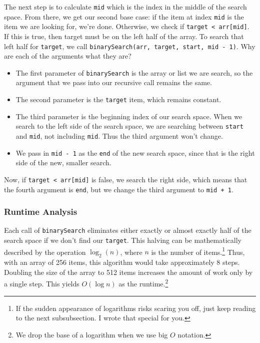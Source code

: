 The next step is to calculate \texttt{mid} which is the index in the middle of the search space.  From there, we get our second base case:  if the item at index \texttt{mid} is the item we are looking for, we're done.   Otherwise, we check if \texttt{target < arr[mid]}.  If this is true, then target must be on the left half of the array.  To search that left half for \texttt{target}, we call \texttt{binarySearch(arr, target, start, mid - 1)}.    Why are each of the arguments what they are?

\begin{itemize}
	\item The first parameter of \texttt{binarySearch} is the array or list we are search, so the argument that we pass into our recursive call remains the same.
	\item The second parameter is the \texttt{target} item, which remains constant.
	\item The third parameter is the beginning index of our search space.  When we search to the left side of the search space, we are searching between \texttt{start} and \texttt{mid}, not including \texttt{mid}.  Thus the third argument won't change.
	\item We pass in \texttt{mid - 1} as the \texttt{end} of the new search space, since that is the right side of the new, smaller search.
\end{itemize}


Now, if  \texttt{target < arr[mid]} is false, we search the right side, which means that the fourth argument is \texttt{end}, but we change the third argument to \texttt{mid + 1}.




\subsubsection{Runtime Analysis}
Each call of \texttt{binarySearch} eliminates either exactly or almost exactly half of the search space if we don't find our \texttt{target}.  This halving can be mathematically  described by the operation $\log_2(n)$, where $n$ is the number of items.\footnote{If the sudden appearance of logarithms risks scaring you off, just keep reading to the next subsubsection.  I wrote that special for you.}  Thus, with an array of 256 items, this algorithm would take approximately 8 steps. Doubling the size of the array to 512 items increases the amount of work only by a single step. This yields $O(\log n)$  as the runtime.\footnote{ We drop the base of a logarithm when we use big $O$ notation.}    
 
